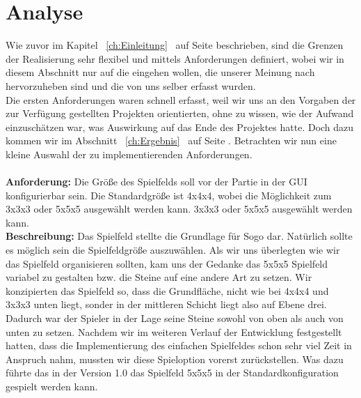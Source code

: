 \documentclass[a4paper]{scrartcl}
\begin{document}
\section{Analyse}\label{ch:Analyse}

Wie zuvor im Kapitel ~\ref{ch:Einleitung} \glqq{}\grqq \ auf Seite \pageref{ch:Einleitung} beschrieben, sind die Grenzen der Realisierung sehr flexibel und mittels Anforderungen definiert, wobei wir in diesem Abschnitt nur auf die eingehen wollen, die unserer Meinung nach hervorzuheben sind und die von uns selber erfasst wurden.
\\
Die ersten Anforderungen waren schnell erfasst, weil wir uns an den Vorgaben der zur Verfügung gestellten Projekten orientierten, ohne zu wissen, wie der Aufwand einzuschätzen war, was Auswirkung auf das Ende des Projektes hatte. Doch dazu kommen wir im Abschnitt ~\ref{ch:Ergebnis} \glqq{}\grqq \ auf Seite \pageref{ch:Ergebnis}. Betrachten wir nun eine kleine Auswahl der zu implementierenden Anforderungen. 
\\
\\
\textbf{Anforderung:} 
Die Größe des Spielfelds soll vor der Partie in der GUI konfigurierbar sein. Die Standardgröße ist 4x4x4, wobei die Möglichkeit zum 3x3x3 oder 5x5x5 ausgewählt werden kann. 3x3x3 oder 5x5x5 ausgewählt werden kann.
\\
\textbf{Beschreibung:} Das Spielfeld stellte die Grundlage für Sogo dar. Natürlich sollte es möglich sein die Spielfeldgröße auszuwählen. Als wir uns überlegten wie wir das Spielfeld organisieren sollten, kam uns der Gedanke das 5x5x5 Spielfeld variabel zu gestalten bzw. die Steine auf eine andere Art zu setzen. Wir konzipierten das Spielfeld so, dass die Grundfläche, nicht wie bei 4x4x4 und 3x3x3 unten liegt, sonder in der mittleren Schicht liegt also auf Ebene drei.  Dadurch war der Spieler in der Lage seine Steine sowohl von oben als auch von unten zu setzen. Nachdem wir im weiteren Verlauf der Entwicklung festgestellt hatten, dass die Implementierung des einfachen Spielfeldes schon sehr viel Zeit in Anspruch nahm, mussten wir diese Spieloption vorerst zurückstellen. Was dazu führte das in der Version 1.0 das Spielfeld 5x5x5 in der Standardkonfiguration gespielt werden kann.
\\ 
\\
\end{document}
